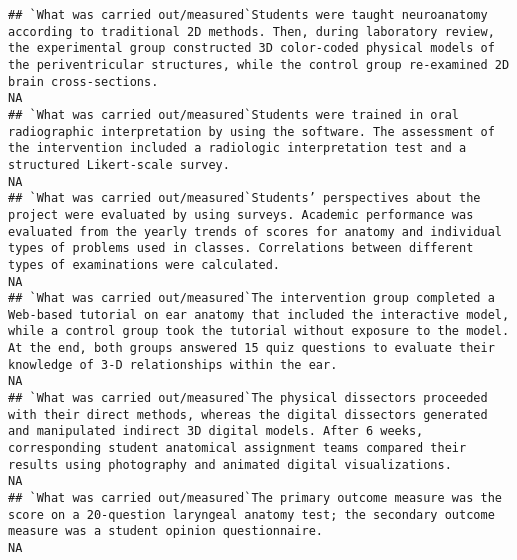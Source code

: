 \documentclass[]{article}
\begin{document}
\begin{verbatim}
## `What was carried out/measured`Students were taught neuroanatomy according to traditional 2D methods. Then, during laboratory review, the experimental group constructed 3D color-coded physical models of the periventricular structures, while the control group re-examined 2D brain cross-sections.                                                                                                                                                                              NA
## `What was carried out/measured`Students were trained in oral radiographic interpretation by using the software. The assessment of the intervention included a radiologic interpretation test and a structured Likert-scale survey.                                                                                                                                                                                                                                                   NA
## `What was carried out/measured`Students’ perspectives about the project were evaluated by using surveys. Academic performance was evaluated from the yearly trends of scores for anatomy and individual types of problems used in classes. Correlations between different types of examinations were calculated.                                                                                                                                                                     NA
## `What was carried out/measured`The intervention group completed a Web-based tutorial on ear anatomy that included the interactive model, while a control group took the tutorial without exposure to the model. At the end, both groups answered 15 quiz questions to evaluate their knowledge of 3-D relationships within the ear.                                                                                                                                                  NA
## `What was carried out/measured`The physical dissectors proceeded with their direct methods, whereas the digital dissectors generated and manipulated indirect 3D digital models. After 6 weeks, corresponding student anatomical assignment teams compared their results using photography and animated digital visualizations.                                                                                                                                                      NA
## `What was carried out/measured`The primary outcome measure was the score on a 20-question laryngeal anatomy test; the secondary outcome measure was a student opinion questionnaire.                                                                                                                                                                                                                                                                                                 NA

\end{verbatim}
\end{document}

